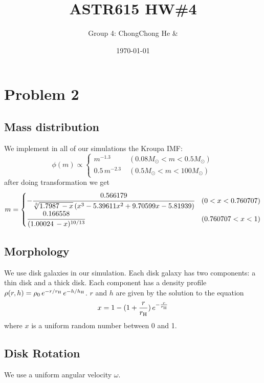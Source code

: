 



\title{ASTR615 HW\#4}
\author{Group 4: ChongChong He \& }
\date{\today}
\maketitle

\section*{Problem 2}
\subsection*{Mass distribution}
We implement in all of our simulations the Kroupa IMF:
\begin{equation}
\phi(m) \propto 
\begin{cases}
m^{-1.3} \; &(0.08M_\odot < m < 0.5M_\odot) \\
0.5 \, m^{-2.3} \; &(0.5M_\odot<m<100M_\odot)
\end{cases}
\end{equation}
after doing transformation we get
\begin{equation}
m=
	\begin{cases}
	-\cfrac{0.566179}{\sqrt[3]{1.7987\, - x} \left(x^3-5.39611 
	x^2+9.70599 x-5.81939\right)} & (0<x<0.760707)\\
	\cfrac{0.166558}{(1.00024\, -x)^{10/13}} & (0.760707<x<1)
	\end{cases}
\end{equation}

\subsection*{Morphology}
We use disk galaxies in our simulation. Each disk galaxy has two components: a 
thin disk and a thick disk. Each component has a density profile $ \rho(r, h) = 
\rho_0 \, e^{-r/r_{\rm H}} \, e^{-h/h_{\rm H}} $. $ r $ and $ h $ are given by the 
solution to the equation
\begin{equation}\label{key}
	x = 1 - (1 + \frac{r}{r_{\rm H}}) \, e^{-\frac{r}{r_{\rm H}}}
\end{equation}
where $ x $ is a uniform random number between 0 and 1.

\subsection*{Disk Rotation}
We use a uniform angular velocity $ \omega $.

